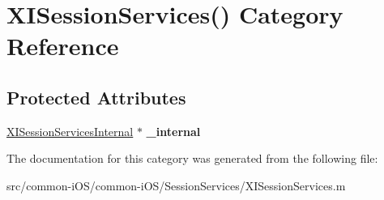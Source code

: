 \hypertarget{category_x_i_session_services_07_08}{}\section{X\+I\+Session\+Services() Category Reference}
\label{category_x_i_session_services_07_08}
\subsection*{Protected Attributes}
\begin{DoxyCompactItemize}
\item 
\hypertarget{category_x_i_session_services_07_08_aa1a7c55c0024430edfa7869a014da86a}{}\label{category_x_i_session_services_07_08_aa1a7c55c0024430edfa7869a014da86a} 
\hyperlink{interface_x_i_session_services_internal}{X\+I\+Session\+Services\+Internal} $\ast$ {\bfseries \+\_\+internal}
\end{DoxyCompactItemize}


The documentation for this category was generated from the following file\+:\begin{DoxyCompactItemize}
\item 
src/common-\/i\+O\+S/common-\/i\+O\+S/\+Session\+Services/X\+I\+Session\+Services.\+m\end{DoxyCompactItemize}
